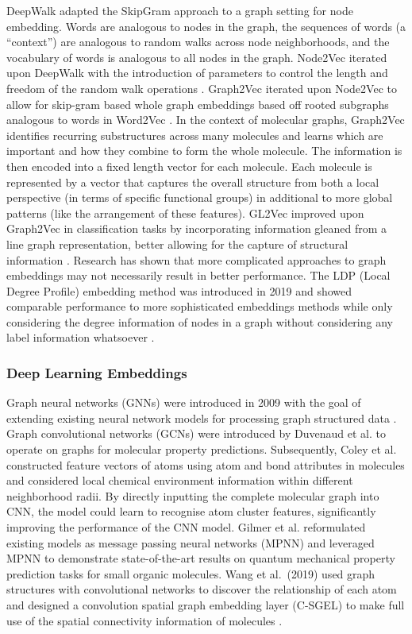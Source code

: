 \documentclass[
  super,
  preprint,
  3p]{elsarticle}
\begin{document}
DeepWalk adapted the SkipGram approach to a graph setting
\citep{perozzi_deepwalk_2014} for node embedding. Words are analogous to
nodes in the graph, the sequences of words (a ``context'') are analogous
to random walks across node neighborhoods, and the vocabulary of words
is analogous to all nodes in the graph. Node2Vec iterated upon DeepWalk
with the introduction of parameters to control the length and freedom of
the random walk operations \citep{RN40}. Graph2Vec iterated upon
Node2Vec to allow for skip-gram based whole graph embeddings based off
rooted subgraphs analogous to words in Word2Vec
\citep{narayanan_graph2vec_2017}. In the context of molecular graphs,
Graph2Vec identifies recurring substructures across many molecules and
learns which are important and how they combine to form the whole
molecule. The information is then encoded into a fixed length vector for
each molecule. Each molecule is represented by a vector that captures
the overall structure from both a local perspective (in terms of
specific functional groups) in additional to more global patterns (like
the arrangement of these features). GL2Vec improved upon Graph2Vec in
classification tasks by incorporating information gleaned from a line
graph representation, better allowing for the capture of structural
information \citep{RN42}. Research has shown that more complicated
approaches to graph embeddings may not necessarily result in better
performance. The LDP (Local Degree Profile) embedding method was
introduced in 2019 and showed comparable performance to more
sophisticated embeddings methods while only considering the degree
information of nodes in a graph without considering any label
information whatsoever \citep{RN32}.

\subsubsection{Deep Learning Embeddings}\label{deep-learning-embeddings}

Graph neural networks (GNNs) were introduced in 2009 with the goal of
extending existing neural network models for processing graph structured
data \citep{scarselli_graph_2009}. Graph convolutional networks (GCNs)
were introduced by Duvenaud et al. \citep{duvenaud2015convolutional} to
operate on graphs for molecular property predictions. Subsequently,
Coley et al. \citep{coley2017convolutional} constructed feature vectors
of atoms using atom and bond attributes in molecules and considered
local chemical environment information within different neighborhood
radii. By directly inputting the complete molecular graph into CNN, the
model could learn to recognise atom cluster features, significantly
improving the performance of the CNN model. Gilmer et al.
\citep{gilmer2017international} reformulated existing models as message
passing neural networks (MPNN) and leveraged MPNN to demonstrate
state-of-the-art results on quantum mechanical property prediction tasks
for small organic molecules. Wang et al.~(2019) used graph structures
with convolutional networks to discover the relationship of each atom
and designed a convolution spatial graph embedding layer (C-SGEL) to
make full use of the spatial connectivity information of molecules
\citep{wang_molecule_2019}.
\end{document}
